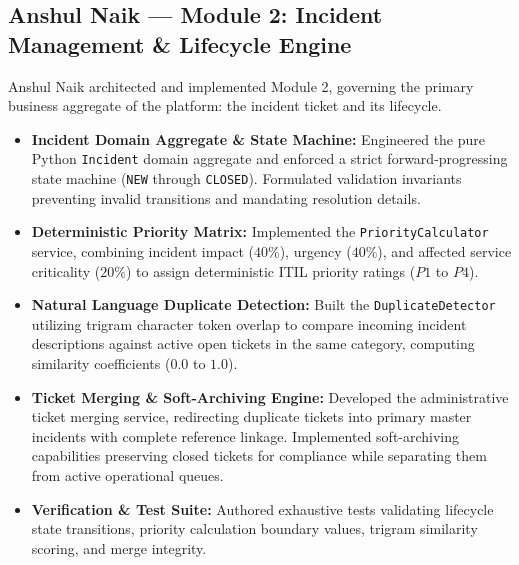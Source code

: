 \documentclass[11pt,a4paper,oneside]{report}
\begin{document}
\subsection{Anshul Naik --- Module 2: Incident Management \& Lifecycle Engine}
\label{subsec:contrib_anshul}
Anshul Naik architected and implemented Module 2, governing the primary business aggregate of the platform: the incident ticket and its lifecycle.
\begin{itemize}
    \item \textbf{Incident Domain Aggregate \& State Machine:} Engineered the pure Python \texttt{Incident} domain aggregate and enforced a strict forward-progressing state machine (\texttt{NEW} through \texttt{CLOSED}). Formulated validation invariants preventing invalid transitions and mandating resolution details.
    \item \textbf{Deterministic Priority Matrix:} Implemented the \texttt{PriorityCalculator} service, combining incident impact ($40\%$), urgency ($40\%$), and affected service criticality ($20\%$) to assign deterministic ITIL priority ratings ($P1$ to $P4$).
    \item \textbf{Natural Language Duplicate Detection:} Built the \texttt{DuplicateDetector} utilizing trigram character token overlap to compare incoming incident descriptions against active open tickets in the same category, computing similarity coefficients ($0.0$ to $1.0$).
    \item \textbf{Ticket Merging \& Soft-Archiving Engine:} Developed the administrative ticket merging service, redirecting duplicate tickets into primary master incidents with complete reference linkage. Implemented soft-archiving capabilities preserving closed tickets for compliance while separating them from active operational queues.
    \item \textbf{Verification \& Test Suite:} Authored exhaustive tests validating lifecycle state transitions, priority calculation boundary values, trigram similarity scoring, and merge integrity.
\end{itemize}
\end{document}
